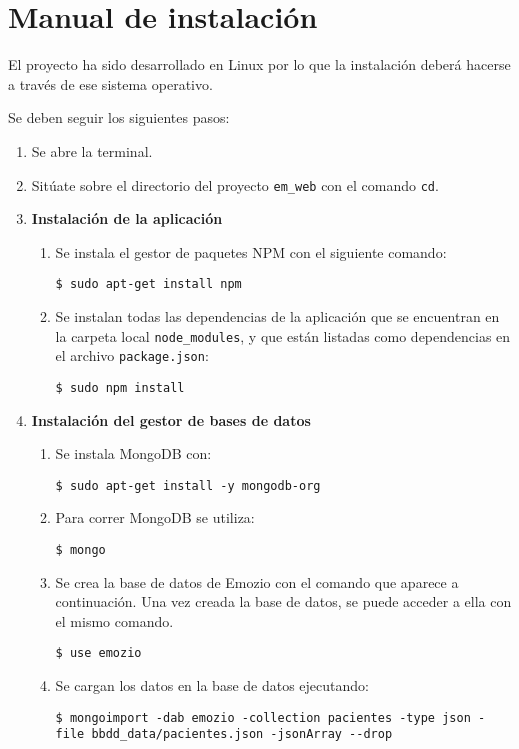 \chapter{Manual de instalación}

El proyecto ha sido desarrollado en Linux por lo que la instalación deberá hacerse a través de ese sistema operativo. 


Se deben seguir los siguientes pasos:

\begin{enumerate}
\item Se abre la terminal.
\item Sitúate sobre el directorio del proyecto \texttt{em\_web} con el comando \texttt{cd}.
\item \textbf{Instalación de la aplicación}
\begin{enumerate}
\item Se instala el gestor de paquetes NPM con el siguiente comando:
	\begin{lstlisting}[style=consola, numbers=none]
	$ sudo apt-get install npm
	\end{lstlisting}
\item Se instalan todas las dependencias de la aplicación que se encuentran en la carpeta local \texttt{node\_modules}, y que están listadas como dependencias en el archivo \texttt{package.json}:
	\begin{lstlisting}[style=consola, numbers=none]
	$ sudo npm install
	\end{lstlisting}
\end{enumerate}
\item \textbf{Instalación del gestor de bases de datos}
\begin{enumerate}
\item Se instala MongoDB con:
	\begin{lstlisting}[style=consola, numbers=none]
	$ sudo apt-get install -y mongodb-org
	\end{lstlisting}
\item Para correr MongoDB se utiliza:
	\begin{lstlisting}[style=consola, numbers=none]
	$ mongo
	\end{lstlisting}
\item Se crea la base de datos de Emozio con el comando que aparece a continuación. Una vez creada la base de datos, se puede acceder a ella con el mismo comando.
	\begin{lstlisting}[style=consola, numbers=none]
	$ use emozio
	\end{lstlisting}
\item Se cargan los datos en la base de datos ejecutando:
	\begin{lstlisting}[style=consola, numbers=none]
$ mongoimport -dab emozio -collection pacientes -type json -file bbdd_data/pacientes.json -jsonArray --drop
	

\end{lstlisting}
\end{enumerate}
\end{enumerate}
